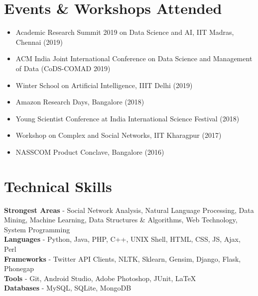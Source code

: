\documentclass[margin, centered]{res}
\begin{document}
\begin{resume}
\section{Events \& Workshops Attended}
\begin{itemize}[leftmargin=*]
\item Academic Research Summit 2019 on Data Science and AI, IIT Madras, Chennai (2019)
\item ACM India Joint International Conference on Data Science and Management of Data (CoDS-COMAD 2019)
\item Winter School on Artificial Intelligence, IIIT Delhi (2019)
\item Amazon Research Days, Bangalore (2018)
\item Young Scientist Conference at India International Science Festival (2018)
\item Workshop on Complex and Social Networks, IIT Kharagpur (2017)
\item NASSCOM Product Conclave, Bangalore (2016)
\end{itemize}


\section{Technical \hspace{2mm} Skills}
\textbf{Strongest Areas} - Social Network Analysis, Natural Language Processing, Data Mining, Machine Learning, Data Structures \& Algorithms, Web Technology, System Programming \\
\textbf{Languages} - Python, Java, PHP, C++, UNIX Shell, HTML, CSS, JS, Ajax, Perl \\
\textbf{Frameworks} - Twitter API Clients, NLTK, Sklearn, Gensim, Django, Flask, Phonegap \\
\textbf{Tools} - Git, Android Studio, Adobe Photoshop, JUnit, \LaTeX \\
\textbf{Databases} - MySQL, SQLite, MongoDB \\



\end{resume}
\end{document}
